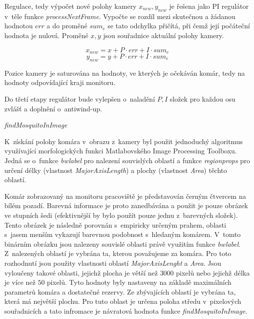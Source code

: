 \documentclass[a4paper,10pt]{article}
\begin{document}
	        Regulace, tedy výpočet nové polohy kamery $x_{new}, y_{new}$ je řešena jako PI
		regulátor v~těle funkce \textit{processNextFrame}. 
	        Vypočte se rozdíl mezi skutečnou a žádanou hodnotou $err$ a do
		proměné $sum_e$ se tato odchylka přičítá, při čemž její počáteční hodnota je
		nulová. Proměné $x, y$ jsou souřadnice aktuální polohy kamery.

		$$x_{new} = x + P\cdot err + I\cdot sum_e$$
		$$y_{new} = y + P\cdot err + I\cdot sum_e$$

		Pozice kamery je saturována na hodnoty, ve
		kterých je očekáván komár, tedy na hodnoty odpovídající kraji monitoru.

		Do třetí etapy regulátor bude vylepšen o~naladění $P, I$ složek pro každou osu
		zvlášť a doplnění o~antiwind-up. 

		\vspace{0.5cm}
		\textit{findMosquitoInImage}

		K~získání polohy komára v~obrazu z~kamery byl použit jednoduchý algoritmus
		využívající morfologických funkci Matlabovského Image Processing Toolboxu. Jedná
		se o~funkce \textit{bwlabel} pro nalezení souvislých oblastí a funkce
		\textit{regionprops} pro určení délky (vlastnost \textit{MajorAxisLength}) a
		plochy (vlastnost \textit{Area}) těchto oblastí.


		Komár zobrazovaný na monitoru pracoviště je představován černým čtver\-cem na
		bílém pozadí. Barevná informace je proto zanedbávána a použit je pouze obrázek
		ve stupních šedi (efektivnější by bylo použít pouze jednu z~barevných složek).
		Tento obrázek je následně porovnán s~empiricky určeným prahem, oblasti s~jasem
		menším vykazují barevnou podobnost s~hledaným komárem. V~tomto binárním obrázku
		jsou nalezeny souvislé oblasti právě využitím funkce \textit{bwlabel}.
Z~nalezených oblastí je vybrána ta, kterou považujeme za komára. Pro toto
		rozhodnutí jsou použity vlastnosti oblastí \textit{MajorAxisLenght} a
		\textit{Area}. Jsou vyloučeny takové oblasti, jejichž plocha je větší než $3000$
		pixelů nebo jejichž délka je více než $50$ pixelů. Tyto hodnoty byly nastaveny
		na základě maximálních parametrů komára a dostatečné rezervy. Ze zbývajících
		oblastí je vybrána ta, která má největší plochu. Pro tuto oblast je určena
		poloha středu v~pixelových souřadnicích a tato infromace je návratová hodnota
		funkce \textit{findMosquitoInImage}.
\end{document}
